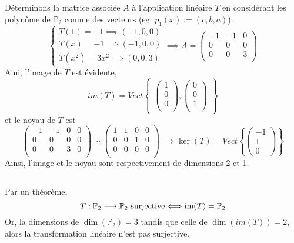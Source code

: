 \subsection{}
Déterminons la matrice associée $A$ à l'application linéaire $T$ en considérant les polynôme de $\mathbb{P}_2$ comme des vecteurs (eg: $p_1(x):=(c,b,a)$).
\[\begin{cases}
T(1)=-1\implies (-1,0,0)\\
T(x)=-1\implies (-1,0,0)\\
T(x^2)=3x^2\implies (0,0,3)
\end{cases}\implies A=
\begin{pmatrix}
-1 & -1 & 0 \\
0 & 0 & 0 \\
0 & 0 & 3 \\
\end{pmatrix}\]
Aini, l'image de $T$ est évidente,\[im(T)=Vect
\begin{Bmatrix}
\left(
\begin{array}{c}
1 \\
0 \\
0 \\
\end{array}
\right),\left(
\begin{array}{c}
0 \\
0 \\
1 \\
\end{array}
\right)
\end{Bmatrix}\]
et le noyau de $T$ est 
\[\left(
\begin{array}{ccc|c}
-1 & -1 & 0 & 0 \\
0 & 0 & 0 & 0 \\
0 & 0 & 3 & 0 \\
\end{array}
\right)\sim\left(
\begin{array}{ccc|c}
1 & 1 & 0 & 0 \\
0 & 0 & 1 & 0 \\
0 & 0 & 0 & 0 \\
\end{array}
\right)\implies\ker(T)=Vect\left\{\begin{pmatrix}
-1\\1\\0
\end{pmatrix}\right\}\]
Ainsi, l'image et le noyau sont respectivement de dimensions 2 et 1.
\subsection{}
Par un théorème,
	\[T:\mathbb{P}_2\longrightarrow\mathbb{P}_2\text{\normalfont{ surjective}}\Longleftrightarrow\text{\normalfont{im}}(T)=\mathbb{P}_2\]
Or, la dimensions de $\dim(\mathbb{P}_2)=3$ tandis que celle de $\dim(im(T))=2$, alors la transformation linéaire n'est pas surjective.
